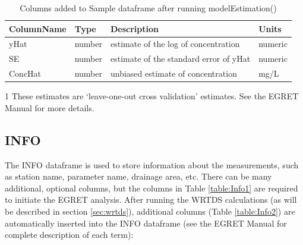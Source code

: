 \documentclass[a4paper,11pt]{article}\usepackage[]{graphicx}\usepackage[]{color}
\begin{document}
\begin{table}[!ht]
\centering
\begin{threeparttable}[b]
\caption{Columns added to Sample dataframe after running modelEstimation()} 
\label{table:Sample2}
\begin{tabular}{llll}
  \hline
ColumnName & Type & Description & Units \\ 
  \hline
yHat\tnote{1} & number & estimate of the log of concentration & numeric \\ 
  SE\tnote{1} & number & estimate of the standard error of yHat & numeric \\ 
  ConcHat\tnote{1} & number & unbiased estimate of concentration & mg/L \\ 
   \hline
\end{tabular}

  \begin{tablenotes}
    \item[1] These estimates are `leave-one-out cross validation' estimates.  See the EGRET Manual for more details.
  \end{tablenotes}
 \end{threeparttable}
\end{table}



\FloatBarrier
\pagebreak


\subsection{INFO}
\label{sec:dataframesINFO}
The INFO dataframe is used to store information about the measurements, such as station name, parameter name, drainage area, etc. There can be many additional, optional columns, but the columns in Table \ref{table:Info1} are required to initiate the EGRET analysis. After running the WRTDS calculations (as will be described in section \ref{sec:wrtds}), additional columns (Table \ref{table:Info2}) are automatically inserted into the INFO dataframe (see the EGRET Manual for complete description of each term):
\end{document}
